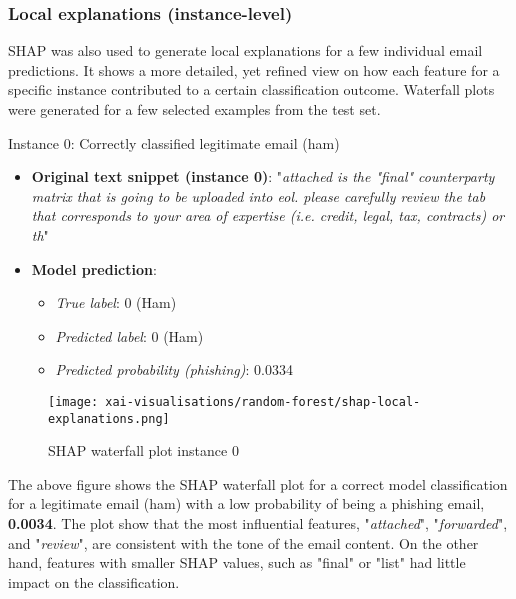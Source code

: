 
\subsubsection*{Local explanations (instance-level)}
SHAP was also used to generate local explanations for a few individual email predictions. It shows a more detailed, yet refined view on how each feature for a specific instance contributed to a certain classification outcome. Waterfall plots were generated for a few selected examples from the test set.\newline

\noindent Instance 0: Correctly classified legitimate email (ham)

\begin{itemize}
  \item \textbf{Original text snippet (instance 0)}: "\textit{attached is the "final" counterparty matrix that is going to be uploaded into eol. please carefully review the tab that corresponds to your area of expertise (i.e. credit, legal, tax, contracts) or th}"
  \item \textbf{Model prediction}:
  \begin{itemize}
    \item \textit{True label}: 0 (Ham)
    \item \textit{Predicted label}: 0 (Ham)
    \item \textit{Predicted probability (phishing)}: 0.0334
  \end{itemize}
\end{itemize}

\begin{figure}[H]
  \begin{center}
    \texttt{[image: xai-visualisations/random-forest/shap-local-explanations.png]}
    \caption{SHAP waterfall plot instance 0}
  \end{center}
\end{figure}

\noindent The above figure shows the SHAP waterfall plot for a correct model classification for a legitimate email (ham) with a low probability of being a phishing email, \textbf{0.0034}. The plot show that the most influential features, "\textit{attached}", "\textit{forwarded}", and "\textit{review}", are consistent with the tone of the email content. On the other hand, features with smaller SHAP values, such as "final" or "list" had little impact on the classification. \newline

